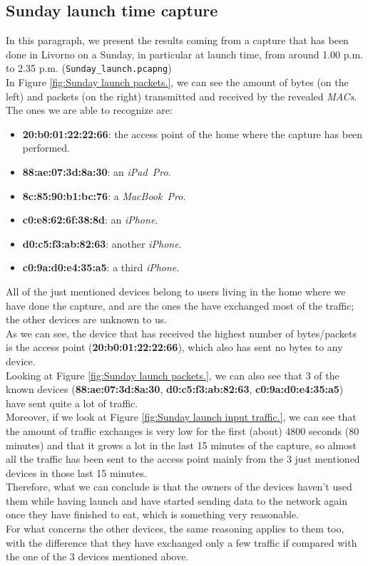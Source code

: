 \subsection{Sunday launch time capture}
In this paragraph, we present the results coming from a capture that has been done in Livorno on a Sunday, in particular at
launch time, from around 1.00 p.m. to 2.35 p.m. (\texttt{Sunday\_launch.pcapng})\\ 
In Figure \ref{fig:Sunday launch packets.}, we can see the amount of bytes (on the left) and packets (on the right)
transmitted and received by the revealed \textit{MACs}. The ones we are able to recognize are:
\begin{itemize}
    \item \textbf{20:b0:01:22:22:66}: the access point of the home where the capture has been performed.
    \item \textbf{88:ae:07:3d:8a:30}: an \textit{iPad\ Pro}.
    \item \textbf{8c:85:90:b1:bc:76}: a \textit{MacBook\ Pro}.
    \item \textbf{c0:e8:62:6f:38:8d}: an \textit{iPhone}.
    \item \textbf{d0:c5:f3:ab:82:63}: another \textit{iPhone}.
    \item \textbf{c0:9a:d0:e4:35:a5}: a third \textit{iPhone}.
\end{itemize}
All of the just mentioned devices belong to users living in the home where we have done the capture, and are the ones the have
exchanged most of the traffic; the other devices are unknown to us.\\
As we can see, the device that has received the highest number of bytes/packets is the access point (\textbf{20:b0:01:22:22:66}),
which also has sent no bytes to any device. \\
Looking at Figure \ref{fig:Sunday launch packets.}, we can also see that 3 of the known devices (\textbf{88:ae:07:3d:8a:30}, 
\textbf{d0:c5:f3:ab:82:63}, \textbf{c0:9a:d0:e4:35:a5}) have sent quite a lot of traffic.\\
Moreover, if we look at Figure \ref{fig:Sunday launch input traffic.}, we can see that the amount of traffic exchanges is very
low for the first (about) 4800 seconds (80 minutes) and that it grows a lot in the last 15 minutes of the capture, so almost all the 
traffic has been sent to the access point mainly from the 3 just mentioned devices in those last 15 minutes.\\
Therefore, what we can conclude is that the owners of the devices haven't used them while having launch and have started 
sending data to the network again once they have finished to eat, which is something very reasonable.\\
For what concerns the other devices, the same reasoning applies to them too, with the difference that they have exchanged only a 
few traffic if compared with the one of the 3 devices mentioned above. 


